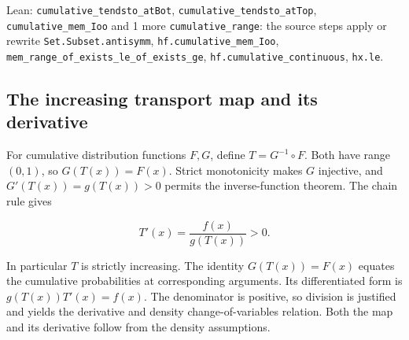 \documentclass[11pt,a4paper]{report}
\begin{document}
\begin{leanbox}{Lean: \texttt{cumulative\_\allowbreak{}tendsto\_\allowbreak{}atBot}, \texttt{cumulative\_\allowbreak{}tendsto\_\allowbreak{}atTop}, \texttt{cumulative\_\allowbreak{}mem\_\allowbreak{}Ioo} and 1 more}
\texttt{cumulative\_\allowbreak{}range}: the source steps apply or rewrite \texttt{Set.\allowbreak{}Subset.\allowbreak{}antisymm}, \texttt{hf.\allowbreak{}cumulative\_\allowbreak{}mem\_\allowbreak{}Ioo}, \texttt{mem\_\allowbreak{}range\_\allowbreak{}of\_\allowbreak{}exists\_\allowbreak{}le\_\allowbreak{}of\_\allowbreak{}exists\_\allowbreak{}ge}, \texttt{hf.\allowbreak{}cumulative\_\allowbreak{}continuous}, \texttt{hx.\allowbreak{}le}.
\end{leanbox}
\subsection{\texorpdfstring{The increasing transport map and its derivative}{The increasing transport map and its derivative}}
\label{report-step-IPLA-PrekopaLeindler-lean-3}


For cumulative distribution functions \(F,G\), define \(T=G^{-1}\circ F\). Both have range \((0,1)\), so \(G(T(x))=F(x)\). Strict monotonicity makes \(G\) injective, and \(G'(T(x))=g(T(x))>0\) permits the inverse-function theorem. The chain rule gives

\[T'(x)=\frac{f(x)}{g(T(x))}>0.\]

In particular \(T\) is strictly increasing. The identity \(G(T(x))=F(x)\) equates the cumulative probabilities at corresponding arguments. Its differentiated form is \(g(T(x))T'(x)=f(x)\). The denominator is positive, so division is justified and yields the derivative and density change-of-variables relation. Both the map and its derivative follow from the density assumptions.
\end{document}
